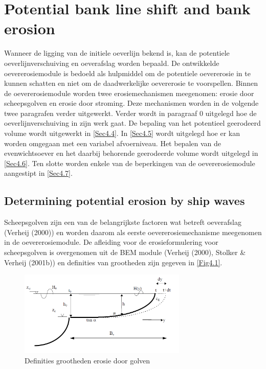 \chapter{Potential bank line shift and bank erosion} \label{Chp4}

Wanneer de ligging van de initiele oeverlijn bekend is, kan de potentiele oeverlijnverschuiving en oeverafslag worden bepaald.
De ontwikkelde oevererosiemodule is bedoeld als hulpmiddel om de potentiele oevererosie in te kunnen schatten en niet om de daadwerkelijke oevererosie te voorspellen.
Binnen de oevererosiemodule worden twee erosiemechanismen meegenomen: erosie door scheepsgolven en erosie door stroming.
Deze mechanismen worden in de volgende twee paragrafen verder uitgewerkt.
Verder wordt in paragraaf 0 uitgelegd hoe de oeverlijnverschuiving in zijn werk gaat.
De bepaling van het potentieel geerodeerd volume wordt uitgewerkt in \autoref{Sec4.4}.
In \autoref{Sec4.5} wordt uitgelegd hoe er kan worden omgegaan met een variabel afvoerniveau.
Het bepalen van de evenwichtsoever en het daarbij behorende geerodeerde volume wordt uitgelegd in \autoref{Sec4.6}.
Ten slotte worden enkele van de beperkingen van de oevererosiemodule aangestipt in \autoref{Sec4.7}.

\section{Determining potential erosion by ship waves} \label{Sec4.1}

Scheepsgolven zijn een van de belangrijkste factoren wat betreft oeverafslag (Verheij (2000))  en worden daarom als eerste oevererosiemechanisme meegenomen in de oevererosiemodule.
 De afleiding voor de erosieformulering voor scheepsgolven is overgenomen uit de BEM module (Verheij (2000), Stolker \& Verheij (2001b)) en definities van grootheden zijn gegeven in \autoref{Fig4.1}.

\begin{figure}
\includegraphics[width=8cm]{figures/Fig4-1.png}
\caption{Definities grootheden erosie door golven}
\label{Fig4.1}
\end{figure}

